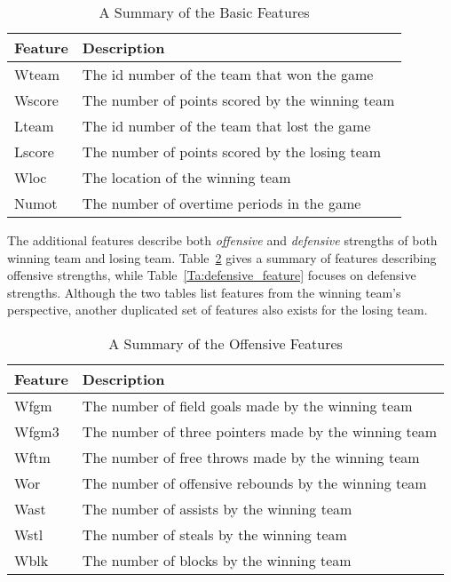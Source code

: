 \begin{table}[h!]
\centering
\begin{tabular}{ | l | l | }
\hline
\textbf{Feature} & \textbf{Description} \\ \hline
Wteam & The id number of the team that won the game \\ \hline
Wscore & The number of points scored by the winning team \\ \hline
Lteam & The id number of the team that lost the game \\ \hline
Lscore & The number of points scored by the losing team \\ \hline
Wloc & The location of the winning team \\ \hline
Numot & The number of overtime periods in the game \\ \hline
\end{tabular}
\caption{A Summary of the Basic Features}\label{Ta:basic_feature}
\end{table}

The additional features describe both \emph{offensive} and \emph{defensive} strengths of both winning team and losing team. Table~\ref{Ta:offensive_feature} gives a summary of features describing offensive strengths, while Table~\ref{Ta:defensive_feature} focuses on defensive strengths. Although the two tables list features from the winning team's perspective, another duplicated set of features also exists for the losing team. 

\begin{table}[h!]
\centering
\begin{tabular}{ | l | l | }
\hline
\textbf{Feature} & \textbf{Description} \\ \hline
Wfgm & The number of field goals made by the winning team\\ \hline
Wfgm3 & The number of three pointers made by the winning team \\ \hline
Wftm & The number of free throws made by the winning team \\ \hline
Wor & The number of offensive rebounds by the winning team \\ \hline
Wast & The number of assists by the winning team \\ \hline
Wstl & The number of steals by the winning team \\ \hline
Wblk & The number of blocks by the winning team \\ \hline
\end{tabular}
\caption{A Summary of the Offensive Features}\label{Ta:offensive_feature}
\end{table}

